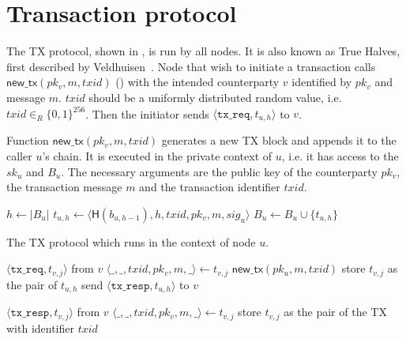 \section{Transaction protocol}
\label{sec:tx-protocol}

The TX protocol, shown in , is run by all nodes.
It is also known as True Halves, first described by Veldhuisen~\cite[Chapter~3.2]{truehalves}.
Node that wish to initiate a transaction calls $\textsf{new\_tx}(pk_v, m, txid)$ () with the intended counterparty $v$ identified by $pk_v$ and message $m$.
$txid$ should be a uniformly distributed random value, i.e. $txid \in_R \{0, 1\}^{256}$.
Then the initiator sends $\langle \texttt{tx\_req}, t_{u, h}\rangle$ to $v$.

\begin{algorithm}
    \caption{Function $\textsf{new\_tx}(pk_v, m, txid)$ generates a new TX block and appends it to the caller $u$'s chain.
    It is executed in the private context of $u$, i.e. it has access to the $sk_u$ and $B_u$.
    The necessary arguments are the public key of the counterparty $pk_v$, the transaction message $m$ and the transaction identifier $txid$.}
    \label{alg:new-tx}

    \begin{algorithmic}
    \State $h \gets |B_u|$
    \State $t_{u, h} \gets \langle \textsf{H}(b_{u, h - 1}), h, txid, pk_v, m, sig_u \rangle$
    \State $B_u \gets B_u \cup \{ t_{u, h} \}$
    \end{algorithmic}
\end{algorithm}

\begin{algorithm}
    \caption{The TX protocol which runs in the context of node $u$.}
    \label{alg:tx-proto}

    \begin{algorithmic}
        \Upon $\langle \texttt{tx\_req}, t_{v, j} \rangle$ from $v$
        \State $\langle \_, \_, txid, pk_v, m, \_ \rangle \gets t_{v, j}$
        \State $\textsf{new\_tx}(pk_u, m, txid)$
        \State store $t_{v, j}$ as the pair of $t_{u, h}$
        \State send $\langle \texttt{tx\_resp}, t_{u, h} \rangle$ to $v$

        \Upon $\langle \texttt{tx\_resp}, t_{v, j} \rangle$ from $v$
        \State $\langle \_, \_, txid, pk_v, m, \_ \rangle \gets t_{v, j}$
        \State store $t_{v, j}$ as the pair of the TX with identifier $txid$
    \end{algorithmic}
\end{algorithm}

